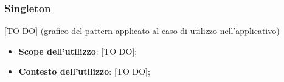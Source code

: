 	\subsubsection{Singleton} %
	\label{ssub:singleton}
	[TO DO] (grafico del pattern applicato al caso di utilizzo nell'applicativo)
		\begin{itemize}
			\item \textbf{Scope dell'utilizzo}: [TO DO];
			\item \textbf{Contesto dell'utilizzo}: [TO DO];
		\end{itemize}
